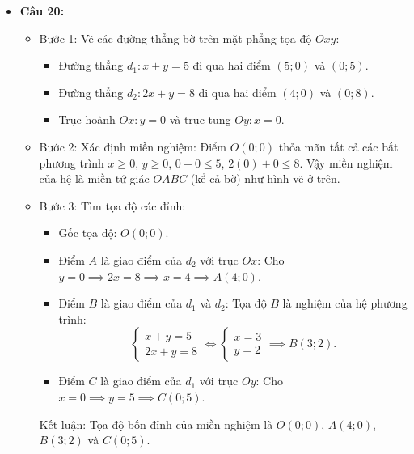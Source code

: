 \documentclass[12pt,a4paper]{article}
\begin{document}
\begin{itemize}[leftmargin=0.6cm, itemsep=3pt]
    \item \textbf{Câu 20:}
    \begin{itemize}
        \item Bước 1: Vẽ các đường thẳng bờ trên mặt phẳng tọa độ $Oxy$:
        \begin{itemize}
            \item Đường thẳng $d_1: x + y = 5$ đi qua hai điểm $(5; 0)$ và $(0; 5)$.
            \item Đường thẳng $d_2: 2x + y = 8$ đi qua hai điểm $(4; 0)$ và $(0; 8)$.
            \item Trục hoành $Ox: y = 0$ và trục tung $Oy: x = 0$.
        \end{itemize}
        \item Bước 2: Xác định miền nghiệm:
        Điểm $O(0; 0)$ thỏa mãn tất cả các bất phương trình $x \ge 0$, $y \ge 0$, $0 + 0 \le 5$, $2(0) + 0 \le 8$.
        Vậy miền nghiệm của hệ là miền tứ giác $OABC$ (kể cả bờ) như hình vẽ ở trên.
        \item Bước 3: Tìm tọa độ các đỉnh:
        \begin{itemize}
            \item Gốc tọa độ: $O(0; 0)$.
            \item Điểm $A$ là giao điểm của $d_2$ với trục $Ox$: Cho $y = 0 \implies 2x = 8 \implies x = 4 \implies A(4; 0)$.
            \item Điểm $B$ là giao điểm của $d_1$ và $d_2$: Tọa độ $B$ là nghiệm của hệ phương trình:
            \[
            \begin{cases} x + y = 5 \\ 2x + y = 8 \end{cases} \iff \begin{cases} x = 3 \\ y = 2 \end{cases} \implies B(3; 2).
            \]
            \item Điểm $C$ là giao điểm của $d_1$ với trục $Oy$: Cho $x = 0 \implies y = 5 \implies C(0; 5)$.
        \end{itemize}
        Kết luận: Tọa độ bốn đỉnh của miền nghiệm là $O(0; 0)$, $A(4; 0)$, $B(3; 2)$ và $C(0; 5)$.
    \end{itemize}


\end{itemize}
\end{document}
